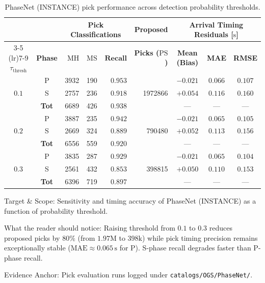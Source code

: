 \begin{table}[htbp]
  \centering
  \small
  \caption{PhaseNet (INSTANCE) pick performance across detection probability thresholds.}
  \label{tab:phasenet_threshold_sweep}
  \begin{threeparttable}
    \begin{tabularx}{\linewidth}{c c r r r r c c c}
      \toprule
      & & \multicolumn{3}{c}{\textbf{Pick Classifications}} & \textbf{Proposed} & \multicolumn{3}{c}{\textbf{Arrival Timing Residuals [$\unit{\second}$]}} \\
      \cmidrule(lr){3-5} \cmidrule(lr){7-9}
      $\tau_{\mathrm{thresh}}$ & \textbf{Phase} & $\mathrm{MH}$ & $\mathrm{MS}$ & $\mathbf{Recall}$ & \textbf{Picks ($\mathrm{PS}$)} & \textbf{Mean (Bias)} & \textbf{MAE} & \textbf{RMSE} \\
      \midrule
      \multirow{3}{*}{$0.1$} & P & \num{3932} & \num{190} & $0.953$ & \multirow{3}{*}{\num{1972866}} & $-0.021$ & $0.066$ & $0.107$ \\
      & S & \num{2757} & \num{236} & $0.918$ & & $+0.054$ & $0.116$ & $0.160$ \\
      & \textbf{Tot} & \num{6689} & \num{426} & $\mathbf{0.938}$ & & --- & --- & --- \\
      \midrule
      \multirow{3}{*}{$0.2$} & P & \num{3887} & \num{235} & $0.942$ & \multirow{3}{*}{\num{790480}} & $-0.021$ & $0.065$ & $0.105$ \\
      & S & \num{2669} & \num{324} & $0.889$ & & $+0.052$ & $0.113$ & $0.156$ \\
      & \textbf{Tot} & \num{6556} & \num{559} & $\mathbf{0.920}$ & & --- & --- & --- \\
      \midrule
      \multirow{3}{*}{$0.3$} & P & \num{3835} & \num{287} & $0.929$ & \multirow{3}{*}{\num{398815}} & $-0.021$ & $0.065$ & $0.104$ \\
      & S & \num{2561} & \num{432} & $0.853$ & & $+0.050$ & $0.110$ & $0.153$ \\
      & \textbf{Tot} & \num{6396} & \num{719} & $\mathbf{0.897}$ & & --- & --- & --- \\
      \bottomrule
    \end{tabularx}
    \begin{tablenotes}[flushleft]
      \footnotesize
      \item Target \& Scope: Sensitivity and timing accuracy of PhaseNet (INSTANCE) as a function of probability threshold.
      \item What the reader should notice: Raising threshold from $0.1$ to $0.3$ reduces proposed picks by $80\%$ (from $1.97\mathrm{M}$ to $398\mathrm{k}$) while pick timing precision remains exceptionally stable ($\mathrm{MAE} \approx 0.065\,\unit{\second}$ for P). S-phase recall degrades faster than P-phase recall.
      \item Evidence Anchor: Pick evaluation runs logged under \texttt{catalogs/OGS/PhaseNet/}.
    \end{tablenotes}
  \end{threeparttable}
\end{table}


